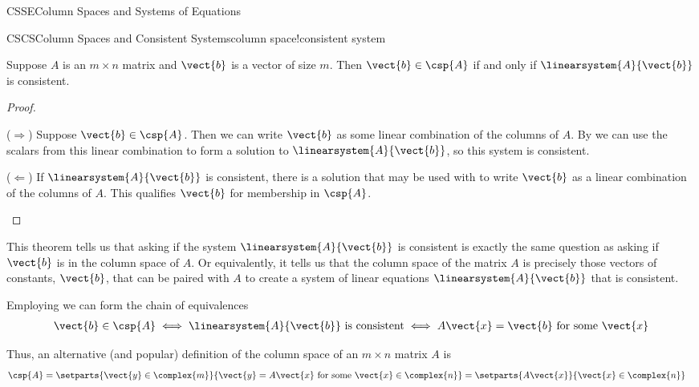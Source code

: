 \begin{subsect}{CSSE}{Column Spaces and Systems of Equations}
%
\begin{theorem}{CSCS}{Column Spaces and Consistent Systems}{column space!consistent system}
\begin{para}Suppose $A$ is an $m\times n$ matrix and $\vect{b}$ is a vector of size $m$.  Then $\vect{b}\in\csp{A}$ if and only if $\linearsystem{A}{\vect{b}}$ is consistent.\end{para}
\end{theorem}
%
\begin{proof}
\begin{para}($\Rightarrow$)  Suppose $\vect{b}\in\csp{A}$.  Then we can write $\vect{b}$ as some linear combination of the columns of $A$.  By  we can use the scalars from this linear combination to form a solution to  $\linearsystem{A}{\vect{b}}$, so this system is consistent.\end{para}
%
\begin{para}($\Leftarrow$) If $\linearsystem{A}{\vect{b}}$ is consistent, there is a solution that may be used with  to write $\vect{b}$ as a linear combination of the columns of $A$.  This qualifies $\vect{b}$ for membership in $\csp{A}$.
\end{para}
\end{proof}
%
\begin{para}This theorem tells us that asking if the system $\linearsystem{A}{\vect{b}}$ is consistent is exactly the same question as asking if $\vect{b}$ is in the column space of $A$.  Or equivalently, it tells us that the column space of the matrix $A$ is precisely those vectors of constants, $\vect{b}$, that can be paired with $A$ to create a system of linear equations $\linearsystem{A}{\vect{b}}$ that is consistent.\end{para}
%
\begin{para}Employing  we can form the chain of equivalences
%
\begin{align*}
\vect{b}\in\csp{A}
\iff
\linearsystem{A}{\vect{b}}\text{ is consistent}
\iff
A\vect{x}=\vect{b}\text{ for some }\vect{x}
\end{align*}
\end{para}
%
\begin{para}Thus, an alternative (and popular) definition of the column space of an $m\times n$ matrix $A$ is
%
\begin{align*}
\csp{A}&=
\setparts{
\vect{y}\in\complex{m}
}{
\vect{y}=A\vect{x}\text{ for some }\vect{x}\in\complex{n}
}
=
\setparts{A\vect{x}}{\vect{x}\in\complex{n}}

\end{align*}
\end{para}
\end{subsect}
